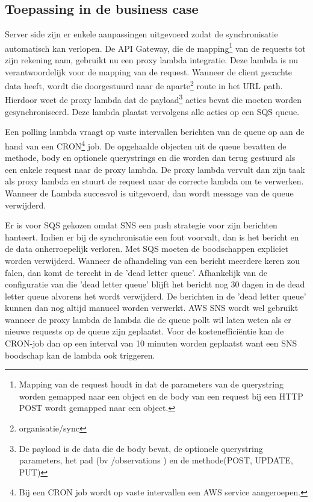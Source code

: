 \subsection{Toepassing in de business case}
Server side zijn er enkele aanpassingen uitgevoerd zodat de synchronisatie automatisch kan verlopen. De API Gateway, die de mapping\footnote{Mapping van de request houdt in dat de parameters van de querystring worden gemapped naar een object en de body van een request bij een HTTP POST wordt gemapped naar een object.} van de requests tot zijn rekening nam, gebruikt nu een proxy lambda integratie. Deze lambda is nu verantwoordelijk voor de mapping van de request. Wanneer de client gecachte data heeft, wordt die doorgestuurd naar de aparte\footnote{ organisatie/sync } route in het URL path. Hierdoor weet de proxy lambda dat de payload\footnote{De payload is de data die de body bevat, de optionele querystring parameters, het pad (bv /observations ) en de methode(POST, UPDATE, PUT)} acties bevat die moeten worden gesynchroniseerd. Deze lambda plaatst vervolgens alle acties op een SQS queue. 

Een polling lambda vraagt op vaste intervallen berichten van de queue op aan de hand van een CRON\footnote{Bij een CRON job wordt op vaste intervallen een AWS service aangeroepen.} job. De opgehaalde objecten uit de queue bevatten de methode, body en optionele querystrings en die worden dan terug gestuurd als een enkele request naar de proxy lambda. De proxy lambda vervult dan zijn taak als proxy lambda en stuurt de request naar de correcte lambda om te verwerken. Wanneer de Lambda succesvol is uitgevoerd, dan wordt message van de queue verwijderd.

Er is voor SQS gekozen omdat SNS een push strategie voor zijn berichten hanteert. Indien er bij de synchronisatie een fout voorvalt, dan is het bericht en de data onherroepelijk verloren. Met SQS moeten de boodschappen expliciet worden verwijderd. 
\clearpage
Wanneer de afhandeling van een bericht meerdere keren zou falen, dan komt de  terecht in de 'dead letter queue'. Afhankelijk van de configuratie van die 'dead letter queue' blijft het bericht nog 30 dagen in de dead letter queue alvorens het wordt verwijderd. De berichten in de 'dead letter queue' kunnen dan nog altijd manueel worden verwerkt. AWS SNS wordt wel gebruikt wanneer de proxy lambda de lambda die de queue pollt wil laten weten als er nieuwe requests op de queue zijn geplaatst. Voor de kosteneffici\"entie kan de CRON-job dan op een interval van 10 minuten worden geplaatst want een SNS boodschap kan de lambda ook triggeren.

